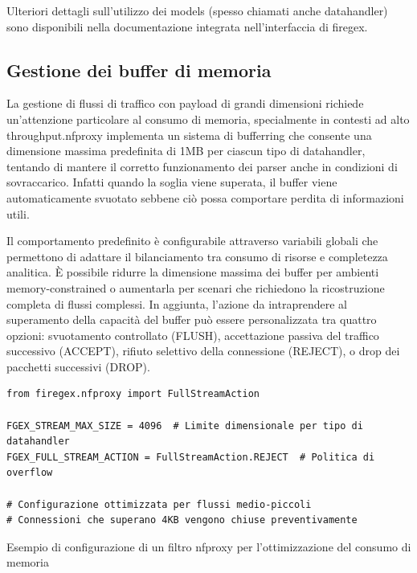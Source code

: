 Ulteriori dettagli sull'utilizzo dei models (spesso chiamati anche datahandler) sono disponibili nella documentazione integrata nell'interfaccia di firegex.

\subsection{Gestione dei buffer di memoria}

La gestione di flussi di traffico con payload di grandi dimensioni richiede un'attenzione particolare al consumo di memoria, specialmente in contesti ad alto throughput.\@ \gls{nfproxy} implementa un sistema di bufferring che consente una dimensione massima predefinita di 1MB per ciascun tipo di datahandler, tentando di mantere il corretto funzionamento dei parser anche in condizioni di sovraccarico. Infatti quando la soglia viene superata, il buffer viene automaticamente svuotato sebbene ciò possa comportare perdita di informazioni utili.

Il comportamento predefinito è configurabile attraverso variabili globali che permettono di adattare il bilanciamento tra consumo di risorse e completezza analitica. È possibile ridurre la dimensione massima dei buffer per ambienti memory-constrained o aumentarla per scenari che richiedono la ricostruzione completa di flussi complessi. In aggiunta, l'azione da intraprendere al superamento della capacità del buffer può essere personalizzata tra quattro opzioni: svuotamento controllato (FLUSH), accettazione passiva del traffico successivo (ACCEPT), rifiuto selettivo della connessione (REJECT), o drop dei pacchetti successivi (DROP).

\begin{listing}[H]
\begin{verbatim}
from firegex.nfproxy import FullStreamAction

FGEX_STREAM_MAX_SIZE = 4096  # Limite dimensionale per tipo di datahandler
FGEX_FULL_STREAM_ACTION = FullStreamAction.REJECT  # Politica di overflow

# Configurazione ottimizzata per flussi medio-piccoli
# Connessioni che superano 4KB vengono chiuse preventivamente
\end{verbatim}
\vspace{-1em}
\caption{Esempio di configurazione di un filtro nfproxy per l'ottimizzazione del consumo di memoria}\label{lst:nfproxy_memory_limit_example}
\end{listing}

